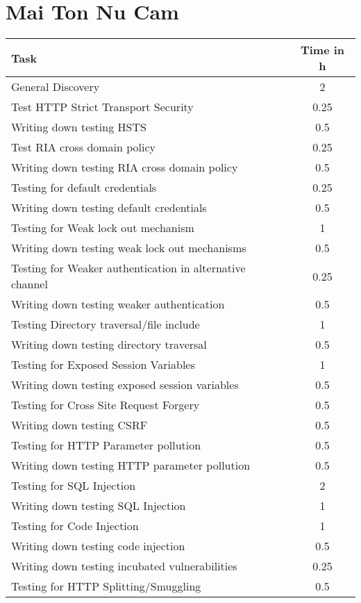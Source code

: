 \section{Mai Ton Nu Cam}
\begin{table}[H]
\tiny
\begin{tabular*}{\textwidth}{@{\extracolsep{\fill}} l c@{\extracolsep{0pt}} }
\textbf{Task} & \textbf{Time in h} \\ \hline
	General Discovery							& 2 \\
	Test HTTP Strict Transport Security 		& 0.25 \\
	Writing down testing HSTS					& 0.5 \\
	Test RIA cross domain policy 				& 0.25 \\
	Writing down testing RIA cross domain policy & 0.5 \\
	Testing for default credentials 			& 0.25 \\
	Writing down testing default credentials 	& 0.5 \\
	Testing for Weak lock out mechanism 		& 1 \\
	Writing down testing weak lock out mechanisms & 0.5 \\
	Testing for Weaker authentication in alternative channel & 0.25 \\
	Writing down testing weaker authentication 	& 0.5 \\
	Testing Directory traversal/file include	& 1 \\
	Writing down testing directory traversal	& 0.5 \\
	Testing for Exposed Session Variables		& 1 \\
	Writing down testing exposed session variables & 0.5 \\
	Testing for Cross Site Request Forgery		& 0.5 \\
	Writing down testing CSRF					& 0.5 \\
	Testing for HTTP Parameter pollution		& 0.5 \\
	Writing down testing HTTP parameter pollution & 0.5 \\
	Testing for SQL Injection					& 2 \\
	Writing down testing SQL Injection 			& 1 \\
	Testing for Code Injection					& 1 \\
	Writing down testing code injection 		& 0.5 \\
	Writing down testing incubated vulnerabilities & 0.25 \\
	Testing for HTTP Splitting/Smuggling		& 0.5 \\

\end{tabular*}
\end{table}
